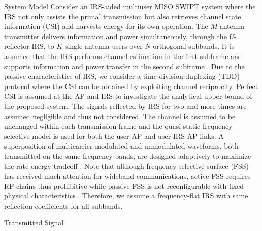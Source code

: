 \documentclass{IEEEtran}
\begin{document}
    \begin{section} {System Model}
        Consider an IRS-aided multiuser MISO SWIPT system where the IRS not only assists the primal transmission but also retrieves channel state information (CSI) and harvests energy for its own operation. The $M$-antenna transmitter delivers information and power simultaneously, through the $U$-reflector IRS, to $K$ single-antenna users over $N$ orthogonal subbands. It is assumed that the IRS performs channel estimation in the first subframe and supports information and power transfer in the second subframe \cite{Zheng2019}. Due to the passive characteristics of IRS, we consider a time-division duplexing (TDD) protocol where the CSI can be obtained by exploiting channel reciprocity. Perfect CSI is assumed at the AP and IRS to investigate the analytical upper-bound of the proposed system. The signals reflected by IRS for two and more times are assumed negligible and thus not considered. The channel is assumed to be unchanged within each transmission frame and the quasi-static frequency-selective model is used for both the user-AP and user-IRS-AP links. A superposition of multicarrier modulated and unmodulated waveforms, both transmitted on the same frequency bands, are designed adaptively to maximize the rate-energy tradeoff \cite{Clerckx2018b}. Note that although frequency selective surface (FSS) has received much attention for wideband communications, active FSS requires RF-chains thus prohibitive while passive FSS is not reconfigurable with fixed physical characteristics \cite{Kim2006,Xu2014,Anwar2018}. Therefore, we assume a frequency-flat IRS with same reflection coefficients for all subbands.

        \begin{subsection} {Transmitted Signal}


\end{subsection}
\end{section}
\end{document}
